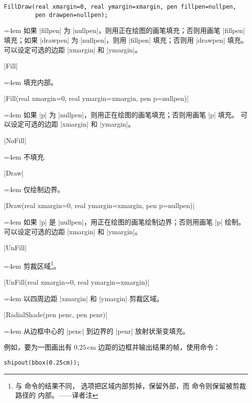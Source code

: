 \documentclass[nofonts,CJKnormalspaces]{ctexbook}[2009/05/20]
\makeatletter
\newenvironment{funclist}{\trivlist
  \parindent=0pt
\item[]
  \def\item{\medskip\par\leftskip=0pt}
  \def\go{\par\leftskip=4em}}
{\endtrivlist}
\newenvironment{typelist}{\itemize
  \let\old@item\@item
  \def\@item[##1]{\expandafter\old@item[\ttfamily\color{type!50!black}##1]}}
{\enditemize}
\newcommand\transnote[1]{\footnote{#1——译者注}}
\makeatother
\begin{document}
\begin{typelist}
\begin{funclist}
\item 
\begin{lstlisting}[style=funclist]
FillDraw(real xmargin=0, real ymargin=xmargin, pen fillpen=nullpen,
         pen drawpen=nullpen);
\end{lstlisting} \go
  如果 |fillpen| 为 |nullpen|，则用正在绘图的画笔填充；否则用画笔 |fillpen|
  填充；如果 |drawpen| 为 |nullpen|，则用 |fillpen| 填充；否则用 |drawpen|
  填充。可以设定可选的边距 |xmargin| 和 |ymargin|。

\item |Fill| \go
  填充内部。

\item |Fill(real xmargin=0, real ymargin=xmargin, pen p=nullpen)| \go
  如果 |p| 为 |nullpen|，则用正在绘图的画笔填充；否则用画笔 |p| 填充。
  可以设定可选的边距 |xmargin| 和 |ymargin|。

\item |NoFill| \go
  不填充.

\item |Draw| \go
  仅绘制边界。

\item |Draw(real xmargin=0, real ymargin=xmargin, pen p=nullpen)| \go
  如果 |p| 是 |nullpen|，用正在绘图的画笔绘制边界；否则用画笔 |p| 绘制。
  可以设定可选的边距 |xmargin| 和 |ymargin|。

\item |UnFill| \go
  剪裁区域\transnote{与  命令的结果不同，
  选项把区域内部剪掉，保留外部，而 \inlinecode{clip} 命令则保留被剪裁路径的
  内部。}。

\item |UnFill(real xmargin=0, real ymargin=xmargin)| \go
  以四周边距 |xmargin| 和 |ymargin| 剪裁区域。

\item |RadialShade(pen penc, pen penr)| \go
  从边框中心的 |penc| 到边界的 |penr| 放射状渐变填充。
\end{funclist}

例如，要为一图画出有 $0.25$\,cm 边距的边框并输出结果的帧，使用命令：
\begin{lstlisting}
shipout(bbox(0.25cm));
\end{lstlisting}


\end{typelist}
\end{document}
